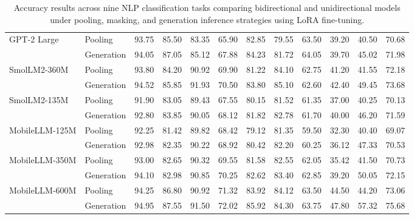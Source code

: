 \begin{table}[htbp]
{\begin{tabular}{l|l|c|c|c|c|c|c|c|c|c|c}
\rowcolor[HTML]{F8DADA} GPT-2 Large & Pooling & 93.75 & 85.50 & 83.35 & 65.90 & 82.85 & 79.55 & 63.50 & 39.20 & 40.50 & 70.68\\
\rowcolor[HTML]{F8DADA}  & Generation & 94.05 & 87.05 & 85.12 & 67.88 & 84.23 &81.72 & 64.05 & 39.70 & 45.02 & 71.98\\
\rowcolor[HTML]{F8DADA} SmolLM2-360M & Pooling & 93.80 & 84.20 & 90.92 & 69.90 & 81.22 & 84.10 & 62.75 & 41.20 & 41.55 & 72.18\\
\rowcolor[HTML]{F8DADA}  & Generation & 94.52 & 85.85 & 91.93 & 70.50 & 83.80 & 85.10 & 62.60 & 42.40 & 49.45 & 73.68\\
\rowcolor[HTML]{F8DADA} SmolLM2-135M & Pooling & 91.90 & 83.05 & 89.43 & 67.55 & 80.15 & 81.52 & 61.35 & 37.00 & 40.25 & 70.13\\
\rowcolor[HTML]{F8DADA}  & Generation & 92.80 & 83.85 & 90.05 & 68.12 & 81.82 & 82.78 & 61.70 & 40.00 & 46.20 & 71.59\\
\rowcolor[HTML]{F8DADA} MobileLLM-125M & Pooling & 92.25 & 81.42 & 89.82 & 68.42 & 79.12 & 81.35 & 59.50 & 32.30 & 40.40 & 69.07\\
\rowcolor[HTML]{F8DADA}  & Generation & 92.98 & 82.35 & 90.22 & 68.92 & 80.42 & 82.20 & 60.25 & 36.12 & 47.33 & 70.53\\
\rowcolor[HTML]{F8DADA} MobileLLM-350M & Pooling & 93.00 & 82.65 & 90.32 & 69.55 & 81.58 & 82.55 & 62.05 & 35.42 & 41.50 & 70.73\\
\rowcolor[HTML]{F8DADA}  & Generation & 94.10 & 82.98 & 90.85 & 70.25 & 82.62 & 83.40 & 62.85 & 39.20 & 50.05 & 72.15\\
\rowcolor[HTML]{F8DADA} MobileLLM-600M & Pooling & 94.25 & 86.80 & 90.92 & 71.32 & 83.92 & 84.12 & 63.50 & 44.50 & 44.20 & 73.06\\
\rowcolor[HTML]{F8DADA}  & Generation & 94.95 & 87.55 & 91.50 & 72.02 & 85.92 & 84.30 & 63.75 & 47.80 & 57.32 & 75.68\\
\hline
\end{tabular}%
}
\caption{Accuracy results across nine NLP classification tasks comparing bidirectional and unidirectional models under pooling, masking, and generation inference strategies using LoRA fine-tuning.}
\label{tab:performance_lora}
\end{table}
